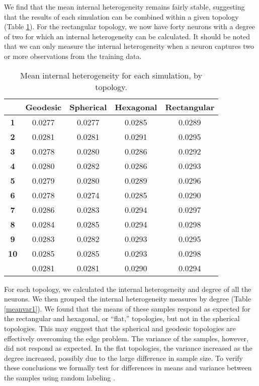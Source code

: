  We find that the
mean internal heterogeneity remains fairly stable, suggesting that the results
of each simulation can be combined within a given topology (Table
\ref{ivtable3}).  For the rectangular
topology, we now have forty neurons with a degree of two for which an internal
heterogeneity can be calculated. It should be noted that we can only measure the
internal heterogeneity when a neuron captures two or more observations from the
training data.

\begin{table}[hbt]
\centering
\caption{Mean internal heterogeneity for each simulation, by topology.}
\label{ivtable3}
\begin{tabular}{|c||c|c|c|c|}
\hline
\textbf{} & Geodesic & Spherical & Hexagonal & Rectangular \\
\hline
\hline
\textbf{1} & 0.0277 & 0.0277 & 0.0285 & 0.0289 \\
\textbf{2} & 0.0281 & 0.0281 & 0.0291 & 0.0295 \\
\textbf{3} & 0.0278 & 0.0280 & 0.0286 & 0.0292 \\
\textbf{4} & 0.0280 & 0.0282 & 0.0286 & 0.0293 \\
\textbf{5} & 0.0279 & 0.0280 & 0.0289 & 0.0296 \\
\textbf{6} & 0.0278 & 0.0274 & 0.0285 & 0.0290 \\
\textbf{7} & 0.0286 & 0.0283 & 0.0294 & 0.0297 \\
\textbf{8} & 0.0284 & 0.0285 & 0.0294 & 0.0298 \\
\textbf{9} & 0.0283 & 0.0282 & 0.0293 & 0.0295 \\
\textbf{10}& 0.0285 & 0.0285 & 0.0293 & 0.0298 \\
\hline
\hline
& 0.0281 & 0.0281 & 0.0290 & 0.0294\\
\hline
\end{tabular} \end{table}

For each topology, we calculated the internal heterogeneity and degree of all
the neurons.  We then grouped the internal heterogeneity measures by degree
(Table \ref{meanvar1}).  We
found that the means of these samples respond as expected for the rectangular
and hexagonal, or ``flat,''  topologies, but not in the spherical topologies.
This may suggest that the spherical and geodesic topologies are effectively
overcoming the edge problem.  The variance of the samples, however, did not
respond as expected.  In the flat topologies, the variance increased as the
degree increased, possibly due to the large difference in sample size.  To
verify these conclusions we formally test for differences in means and variance
between the samples using random labeling \citep{siss2004}.

